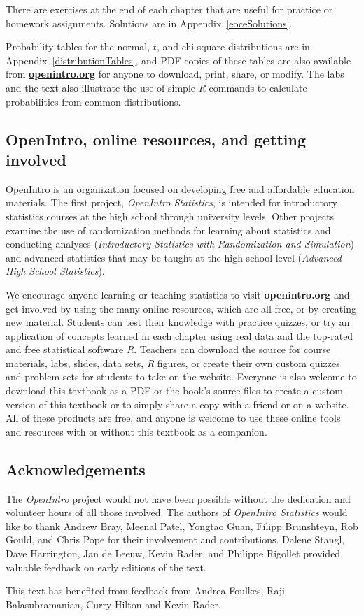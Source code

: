 There are exercises at the end of each chapter that are useful for practice or homework assignments. Solutions are in Appendix~\ref{eoceSolutions}. 

Probability tables for the normal, $t$, and chi-square distributions are in Appendix~\ref{distributionTables}, and PDF copies of these tables are also available from \href{http://www.openintro.org}{\color{black}\textbf{openintro.org}} for anyone to download, print, share, or modify.  The labs and the text also illustrate the use of simple \textsl{R} commands to calculate probabilities from common distributions.

\subsection*{OpenIntro, online resources, and getting involved}

OpenIntro is an organization focused on developing free and affordable education materials. The first project, \emph{OpenIntro Statistics}, is intended for introductory statistics courses at the high school through university levels. Other projects examine the use of randomization methods for learning about statistics and conducting analyses (\emph{Introductory Statistics with Randomization and Simulation}) and advanced statistics that may be taught at the high school level (\emph{Advanced High School Statistics}).

We encourage anyone learning or teaching statistics to visit \textbf{openintro.org} and get involved by using the many online resources, which are all free, or by creating new material. Students can test their knowledge with practice quizzes, or try an application of concepts learned in each chapter using real data and the top-rated and free statistical software \textsl{R}. Teachers can download the source for course materials, labs, slides, data sets, \textsl{R} figures, or create their own custom quizzes and problem sets for students to take on the website. Everyone is also welcome to download this textbook as a PDF or the book's source files to create a custom version of this textbook or to simply share a copy with a friend or on a website. All of these products are free, and anyone is welcome to use these online tools and resources with or without this textbook as a companion.


\subsection*{Acknowledgements}

The \emph{OpenIntro} project would not have been possible without the dedication and volunteer hours of all those involved.  The authors of \textsl{OpenIntro Statistics} would like to thank Andrew Bray, Meenal Patel, Yongtao Guan, Filipp Brunshteyn, Rob Gould, and Chris Pope for their involvement and contributions.  
Dalene Stangl, Dave Harrington, Jan de Leeuw, Kevin Rader, and Philippe Rigollet provided valuable feedback on early editions of the text.

This text has benefited from feedback from Andrea Foulkes, Raji Balasubramanian, Curry Hilton and Kevin Rader.



